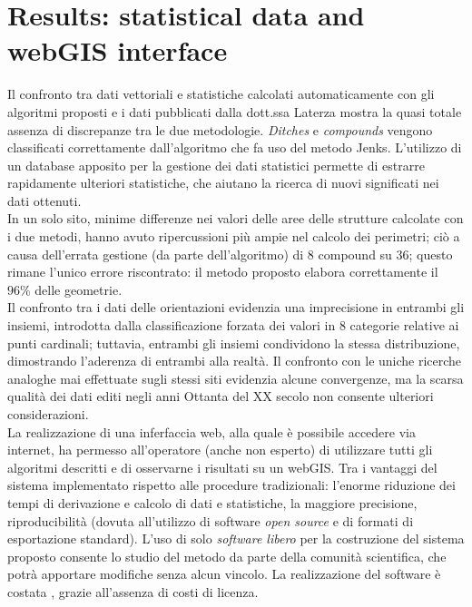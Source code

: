\chapter{Results: statistical data and webGIS interface}

    \begin{chaptersum}
        Il confronto tra dati vettoriali e statistiche calcolati automaticamente con gli algoritmi proposti e i dati pubblicati dalla dott.ssa Laterza \cite{laterza} mostra la quasi totale assenza di discrepanze tra le due metodologie. \emph{Ditches} e \emph{compounds} vengono classificati correttamente dall'algoritmo che fa uso del metodo Jenks. L'utilizzo di un database apposito per la gestione dei dati statistici permette di estrarre rapidamente ulteriori statistiche, che aiutano la ricerca di nuovi significati nei dati ottenuti.\\
        In un solo sito, minime differenze nei valori delle aree delle strutture calcolate con i due metodi, hanno avuto ripercussioni più ampie nel calcolo dei perimetri; ciò a causa dell'errata gestione (da parte dell'algoritmo) di 8 compound su 36; questo rimane l'unico errore riscontrato: il metodo proposto elabora correttamente il $96\%$ delle geometrie.\\
        Il confronto tra i dati delle orientazioni evidenzia una imprecisione in entrambi gli insiemi, introdotta dalla classificazione forzata dei valori in 8 categorie relative ai punti cardinali; tuttavia, entrambi gli insiemi condividono la stessa distribuzione, dimostrando l'aderenza di entrambi alla realtà. Il confronto con le uniche ricerche analoghe mai effettuate sugli stessi siti \cite{jones-tavoliere} evidenzia alcune convergenze, ma la scarsa qualità dei dati editi negli anni Ottanta del XX secolo non consente ulteriori considerazioni.\\
        La realizzazione di una inferfaccia web, alla quale è possibile accedere via internet, ha permesso all'operatore (anche non esperto) di utilizzare tutti gli algoritmi descritti e di osservarne i risultati su un webGIS. Tra i vantaggi del sistema implementato rispetto alle procedure tradizionali: l'enorme riduzione dei tempi di derivazione e calcolo di dati e statistiche, la maggiore precisione, riproducibilità (dovuta all'utilizzo di software \emph{open source} e di formati di esportazione standard). L'uso di solo \emph{software libero} per la costruzione del sistema proposto consente lo studio del metodo da parte della comunità scientifica, che potrà apportare modifiche senza alcun vincolo. La realizzazione del software è costata , grazie all'assenza di costi di licenza.
    \end{chaptersum}

